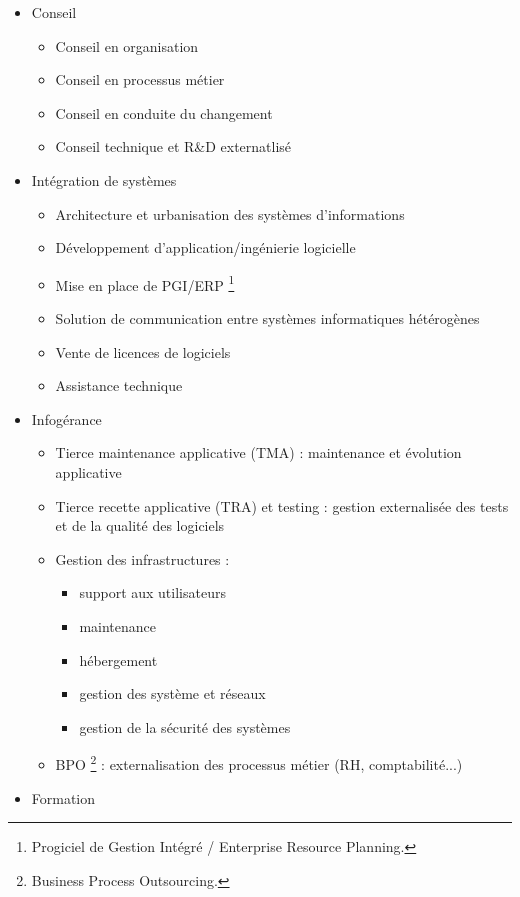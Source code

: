 \documentclass{article}
\begin{document}
\begin{itemize}
  \item Conseil
    \begin{itemize}
      \item Conseil en organisation
      \item Conseil en processus métier
      \item Conseil en conduite du changement
      \item Conseil technique et R{\&}D externatlisé
    \end{itemize}
  \item Intégration de systèmes
    \begin{itemize}
      \item Architecture et urbanisation des systèmes d'informations
      \item Développement d'application/ingénierie logicielle
      \item Mise en place de PGI/ERP \footnote{Progiciel de Gestion Intégré / Enterprise Resource Planning.}
      \item Solution de communication entre systèmes informatiques hétérogènes
      \item Vente de licences de logiciels
      \item Assistance technique
    \end{itemize}
  \item Infogérance
    \begin{itemize}
      \item Tierce maintenance applicative (TMA) : maintenance et évolution applicative
      \item Tierce recette applicative (TRA) et testing : gestion externalisée des tests et de la qualité des logiciels
      \item Gestion des infrastructures :
        \begin{itemize}
          \item support aux utilisateurs
          \item maintenance
          \item hébergement
          \item gestion des système et réseaux
          \item gestion de la sécurité des systèmes
        \end{itemize}
      \item BPO \footnote{Business Process Outsourcing.} : externalisation des processus métier (RH, comptabilité...)
    \end{itemize}
  \item Formation
\end{itemize}
\end{document}
